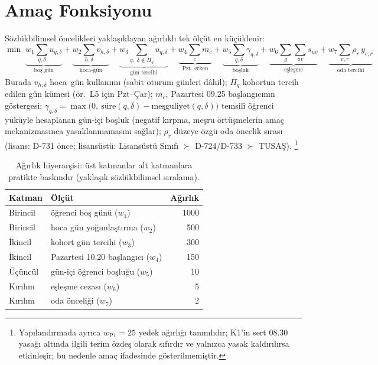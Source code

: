 \documentclass[11pt,a4paper]{article}
\theoremstyle{definition}
\begin{document}
\section{Amaç Fonksiyonu}

Sözlükbilimsel öncelikleri yaklaşıklayan ağırlıklı tek ölçüt en küçüklenir:
\begin{equation}
\min\;
\underbrace{w_1\!\!\sum_{q,\delta} u_{q,\delta}}_{\text{boş gün}}
+\underbrace{w_2\!\!\sum_{h,\delta} v_{h,\delta}}_{\text{hoca-gün}}
+\underbrace{w_3\!\!\sum_{q,\;\delta\notin \Pi_q} u_{q,\delta}}_{\text{gün tercihi}}
+\underbrace{w_4\!\!\sum_{c} m_c}_{\text{Pzt.\ erken}}
+\underbrace{w_5\!\!\sum_{q,\delta} \gamma_{q,\delta}}_{\text{boşluk}}
+\underbrace{w_6\!\!\sum_{g}\sum_{uv} s_{uv}}_{\text{eşleşme}}
+\underbrace{w_7\!\!\sum_{c,r} \rho_r\, y_{c,r}}_{\text{oda tercihi}}
\end{equation}
Burada $v_{h,\delta}$ hoca--gün kullanımı (sabit oturum günleri dâhil);
$\Pi_q$ kohortun tercih edilen gün kümesi (ör.\ L5 için Pzt--Çar);
$m_c$, Pazartesi 09.25 başlangıcının göstergesi;
$\gamma_{q,\delta}=\max\bigl(0,\ \text{süre}(q,\delta)-\text{meşguliyet}(q,\delta)\bigr)$
temsilî öğrenci yüküyle hesaplanan gün-içi boşluk (negatif kırpma, meşru
örtüşmelerin amaç mekanizmasınca yasaklanmamasını sağlar);
$\rho_r$ düzeye özgü oda öncelik sırası (lisans: D-731 önce; lisansüstü:
Lisansüstü Sınıfı $\succ$ D-724/D-733 $\succ$ TUSAŞ).%
\footnote{Yapılandırmada ayrıca $w_{\mathrm{P1}}=25$ yedek ağırlığı tanımlıdır;
K1'in sert 08.30 yasağı altında ilgili terim özdeş olarak sıfırdır ve yalnızca
yasak kaldırılırsa etkinleşir; bu nedenle amaç ifadesinde gösterilmemiştir.}

\begin{table}[h]
\centering
\caption{Ağırlık hiyerarşisi: üst katmanlar alt katmanlara pratikte baskındır
(yaklaşık sözlükbilimsel sıralama).}\label{tab:weights}
\renewcommand{\arraystretch}{1.15}
\begin{tabular}{@{}llr@{}}
\toprule
Katman & Ölçüt & Ağırlık \\
\midrule
Birincil & öğrenci boş günü ($w_1$) & 1000 \\
Birincil & hoca gün yoğunlaştırma ($w_2$) & 500 \\
İkincil & kohort gün tercihi ($w_3$) & 300 \\
İkincil & Pazartesi 10.20 başlangıcı ($w_4$) & 150 \\
Üçüncül & gün-içi öğrenci boşluğu ($w_5$) & 10 \\
Kırılım & eşleşme cezası ($w_6$) & 5 \\
Kırılım & oda önceliği ($w_7$) & 2 \\
\bottomrule
\end{tabular}
\end{table}
\end{document}
